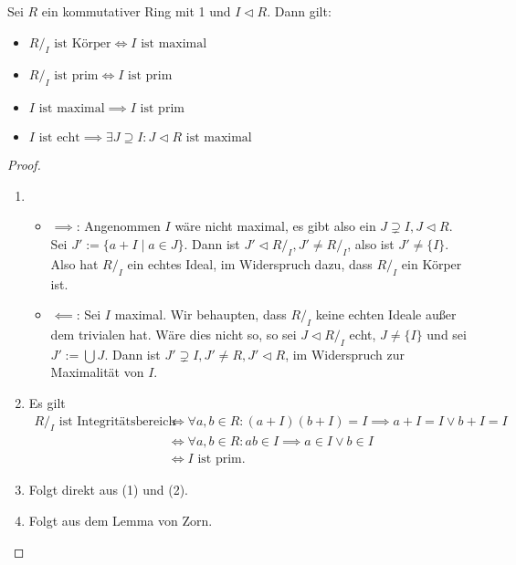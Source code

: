 \begin{proposition}
    Sei $R$ ein kommutativer Ring mit 1 und $I \vartriangleleft R$. Dann gilt:
    \begin{itemize}
        \item $R /_{I} \text{ ist Körper} \Leftrightarrow I \text{ ist maximal}$
        \item $R /_{I} \text{ ist prim} \Leftrightarrow I \text{ ist prim}$
        \item $I \text{ ist maximal} \implies I \text{ ist prim}$
        \item $I \text{ ist echt} \implies \exists J \supseteq I: J \vartriangleleft R \text{ ist maximal}$
    \end{itemize}
\end{proposition}

\begin{proof}{\ }
    \begin{enumerate}
        \item \begin{itemize}
            \item $\implies$: Angenommen $I$ wäre nicht maximal, es gibt also ein $J \supsetneq I, J \vartriangleleft R$.
            Sei $J' := \{ a + I \mid a \in J \}$. Dann ist $J' \vartriangleleft R/_I, J' \neq R/_I$, also ist $J' \neq \{I\}$. Also hat $R/_I$ ein echtes Ideal, im Widerspruch dazu, dass $R/_I$ ein Körper ist.
            \item $\impliedby$: Sei $I$ maximal. Wir behaupten, dass $R/_I$ keine echten Ideale außer dem trivialen hat. Wäre dies nicht so, so sei $J \vartriangleleft R/_I$ echt, $J \neq \{I\}$ und sei $J' := \bigcup J$. Dann ist $J' \supsetneq I, J' \neq R, J' \vartriangleleft R$, im Widerspruch zur Maximalität von $I$.
        \end{itemize}
        \item Es gilt
        \begin{align*}
            R/_I \text{ ist Integritätsbereich} &\Leftrightarrow \forall a, b \in R: (a + I)(b + I) = I \implies a + I = I \lor b + I = I \\
            &\Leftrightarrow \forall a, b \in R: ab \in I \implies a \in I \lor b \in I \\
            &\Leftrightarrow I \text{ ist prim}.
        \end{align*}
        \item Folgt direkt aus (1) und (2).
        \item Folgt aus dem Lemma von Zorn.
    \end{enumerate}
\end{proof}

